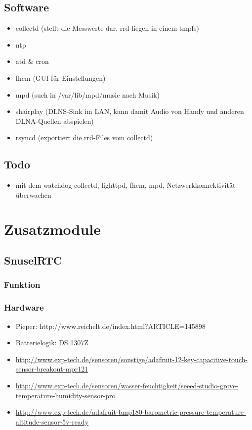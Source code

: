 \documentclass[a4paper,twoside,titlepage,normalheadings,tocleft,bibtotoc]{scrartcl}
\begin{document}
\subsection{Software}
\begin{itemize}
\item collectd (stellt die Messwerte dar, rrd liegen in einem tmpfs)
\item ntp
\item atd \& cron
\item fhem (GUI für Einstellungen)
\item mpd (such in /var/lib/mpd/music nach Musik)
\item shairplay (DLNS-Sink im LAN, kann damit Audio von Handy und anderen DLNA-Quellen abspielen)
\item rsyncd (exportiert die rrd-Files vom collectd)
\end{itemize}
\subsection{Todo}
\begin{itemize}
\item mit dem watchdog collectd, lighttpd, fhem, mpd, Netzwerkkonnektivität überwachen
\end{itemize}



\section{Zusatzmodule}
\subsection{SnuselRTC}
\subsubsection{Funktion}
\subsubsection{Hardware}
\begin{itemize}
\item Pieper: http://www.reichelt.de/index.html?ARTICLE=145898
\item Batterielogik: DS 1307Z
\item \url{http://www.exp-tech.de/sensoren/sonstige/adafruit-12-key-capacitive-touch-sensor-breakout-mpr121}
\item \url{http://www.exp-tech.de/sensoren/wasser-feuchtigkeit/seeed-studio-grove-temperature-humidity-sensor-pro}
\item \url{http://www.exp-tech.de/adafruit-bmp180-barometric-pressure-temperature-altitude-sensor-5v-ready}
\end{itemize}
\end{document}
